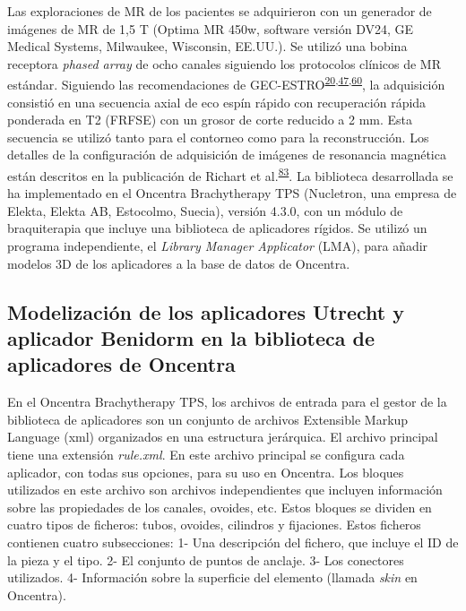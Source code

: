 \documentclass[
  a4paper,
]{scrreprt}
\begin{document}
Las exploraciones de MR de los pacientes se adquirieron con un generador
de imágenes de MR de 1,5 T (Optima MR 450w, software versión DV24, GE
Medical Systems, Milwaukee, Wisconsin, EE.UU.). Se utilizó una bobina
receptora \emph{phased array} de ocho canales siguiendo los protocolos
clínicos de MR estándar. Siguiendo las recomendaciones de
GEC-ESTRO\textsuperscript{\protect\hyperlink{ref-haie-meder2005}{20},\protect\hyperlink{ref-viswanathan2012}{47},\protect\hyperlink{ref-potter2006}{60}},
la adquisición consistió en una secuencia axial de eco espín rápido con
recuperación rápida ponderada en T2 (FRFSE) con un grosor de corte
reducido a 2 mm. Esta secuencia se utilizó tanto para el contorneo como
para la reconstrucción. Los detalles de la configuración de adquisición
de imágenes de resonancia magnética están descritos en la publicación de
Richart et al.\textsuperscript{\protect\hyperlink{ref-richart2015}{83}}.
La biblioteca desarrollada se ha implementado en el Oncentra
Brachytherapy TPS (Nucletron, una empresa de Elekta, Elekta AB,
Estocolmo, Suecia), versión 4.3.0, con un módulo de braquiterapia que
incluye una biblioteca de aplicadores rígidos. Se utilizó un programa
independiente, el \emph{Library Manager Applicator} (LMA), para añadir
modelos 3D de los aplicadores a la base de datos de Oncentra.

\hypertarget{modelizaciuxf3n-de-los-aplicadores-utrecht-y-aplicador-benidorm-en-la-biblioteca-de-aplicadores-de-oncentra}{%
\subsection{Modelización de los aplicadores Utrecht y aplicador Benidorm
en la biblioteca de aplicadores de
Oncentra}\label{modelizaciuxf3n-de-los-aplicadores-utrecht-y-aplicador-benidorm-en-la-biblioteca-de-aplicadores-de-oncentra}}

En el Oncentra Brachytherapy TPS, los archivos de entrada para el gestor
de la biblioteca de aplicadores son un conjunto de archivos Extensible
Markup Language (xml) organizados en una estructura jerárquica. El
archivo principal tiene una extensión \emph{rule.xml}. En este archivo
principal se configura cada aplicador, con todas sus opciones, para su
uso en Oncentra. Los bloques utilizados en este archivo son archivos
independientes que incluyen información sobre las propiedades de los
canales, ovoides, etc. Estos bloques se dividen en cuatro tipos de
ficheros: tubos, ovoides, cilindros y fijaciones. Estos ficheros
contienen cuatro subsecciones: 1- Una descripción del fichero, que
incluye el ID de la pieza y el tipo. 2- El conjunto de puntos de
anclaje. 3- Los conectores utilizados. 4- Información sobre la
superficie del elemento (llamada \emph{skin} en Oncentra).
\end{document}
